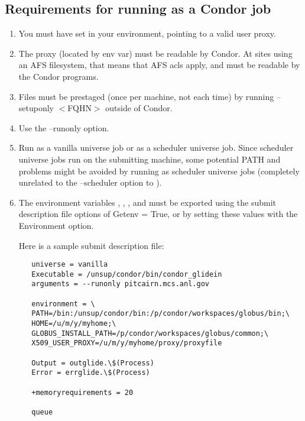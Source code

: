 \subsection{Requirements for running  as a Condor job}
\begin{enumerate}
\item You must have  set in your environment, pointing to a valid user proxy.

\item The proxy (located by  env var) must be readable by
Condor. At sites using an AFS filesystem, that means that AFS acls apply, and must be readable by the Condor programs.

\item Files must be prestaged (once per machine, not each time) by running
 --setuponly $<$FQHN$>$ outside of Condor.

\item Use the --runonly option.

\item Run  as a vanilla universe job or as a scheduler universe 
job. Since scheduler universe jobs run on the submitting machine, some potential
PATH and  problems might be avoided by running as scheduler universe jobs (completely unrelated to the --scheduler option to ).

\item The environment variables   , , , and  must be exported using the submit description file options of Getenv = True, or by setting these values with the Environment option.

Here is a sample submit description file:

\begin{verbatim}
   universe = vanilla
   Executable = /unsup/condor/bin/condor_glidein
   arguments = --runonly pitcairn.mcs.anl.gov

   environment = \
   PATH=/bin:/unsup/condor/bin:/p/condor/workspaces/globus/bin;\
   HOME=/u/m/y/myhome;\
   GLOBUS_INSTALL_PATH=/p/condor/workspaces/globus/common;\
   X509_USER_PROXY=/u/m/y/myhome/proxy/proxyfile

   Output = outglide.\$(Process)
   Error = errglide.\$(Process)

   +memoryrequirements = 20

   queue
\end{verbatim}
\end{enumerate}

